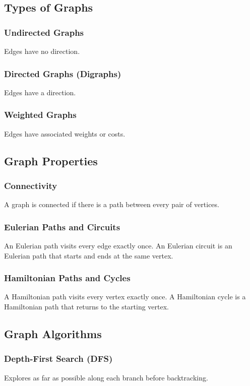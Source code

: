 \documentclass{article}
\begin{document}
\subsection{Types of Graphs}

\subsubsection{Undirected Graphs}
Edges have no direction.

\subsubsection{Directed Graphs (Digraphs)}
Edges have a direction.

\subsubsection{Weighted Graphs}
Edges have associated weights or costs.

\subsection{Graph Properties}

\subsubsection{Connectivity}
A graph is connected if there is a path between every pair of vertices.

\subsubsection{Eulerian Paths and Circuits}
An Eulerian path visits every edge exactly once. An Eulerian circuit is an Eulerian path that starts and ends at the same vertex.

\subsubsection{Hamiltonian Paths and Cycles}
A Hamiltonian path visits every vertex exactly once. A Hamiltonian cycle is a Hamiltonian path that returns to the starting vertex.

\subsection{Graph Algorithms}

\subsubsection{Depth-First Search (DFS)}
Explores as far as possible along each branch before backtracking.
\end{document}

